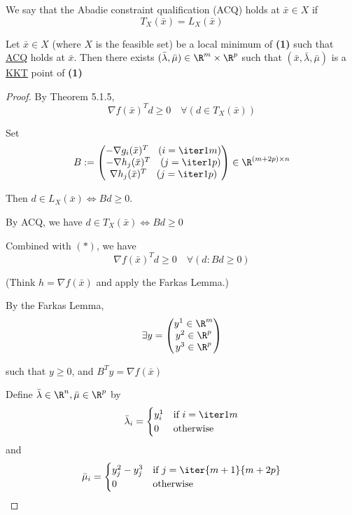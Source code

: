\label{adc266e}

We say that the Abadie constraint qualification (ACQ) holds at $\bar
	x\in X$ if
$$
	T_X(\bar x)=L_X(\bar x)
$$

\label{b1c5437}

Let $\bar x\in X$ (where $X$ is the feasible set) be a local minimum
of \textbf{(1)} such that \href{adc266e}{ACQ} holds at $\bar x$. Then
there exists $(\bar\lambda,\bar\mu)\in\R^m\times\R^p$ such that $(\bar
	x,\bar\lambda,\bar\mu)$ is a \href{b38093d}{KKT} point of
\textbf{(1)}

\begin{proof}
	\def\bm{\bar\mu}\def\bl{\bar\lambda}\def\bx{\bar x}
	By Theorem 5.1.5,
	\begin{equation*}
		\nabla f(\bx)^Td\geq0\quad\forall(d\in T_X(\bx))\tag*{($*$)}
	\end{equation*}

	Set
	$$
		B:=\begin{pmatrix}
			-\nabla g_i(\bx)^T\quad(i=\iter1m) \\
			-\nabla h_j(\bx)^T\quad(j=\iter1p) \\
			\nabla h_j(\bx)^T\quad(j=\iter1p)
		\end{pmatrix}\in\R^{(m+2p)\times{n}}
	$$

	Then $d\in L_X(\bx)\iff Bd\geq0$.

	By ACQ, we have $d\in T_X(\bx)\iff Bd\geq0$

	Combined with $(*)$, we have
	$$
		\nabla f(\bx)^Td\geq0\quad\forall(d:Bd\geq0)
	$$

	(Think $h=\nabla f(\bx)$ and apply the Farkas Lemma.)

	By the Farkas Lemma,
	$$
		\exists y=\begin{pmatrix}y^1\in\R^m\\y^2\in\R^p\\y^3\in\R^p\end{pmatrix}
	$$

	such that $y\geq0$, and $B^Ty=\nabla f(\bx)$

	Define $\bl\in\R^n,\bm\in\R^p$ by
	$$
		\bl_i=\begin{cases}
			y^1_i & \text{if $i=\iter1m$} \\
			0     & \text{otherwise}
		\end{cases}
	$$
	and
	$$
		\bm_i=\begin{cases}
			y^2_j - y^3_j & \text{if $j=\iter{m+1}{m+2p}$} \\
			0             & \text{otherwise}
		\end{cases}
	$$


\end{proof}
